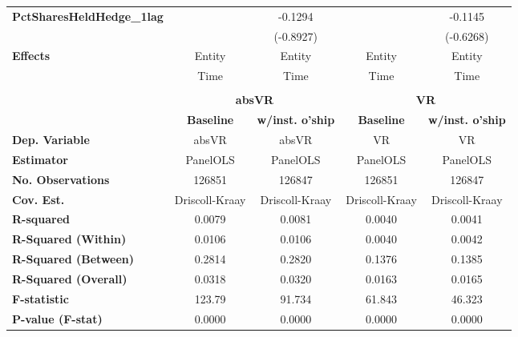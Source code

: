 {\begin{longtable}{>{\bfseries}lcccc}
\textbf{PctSharesHeldHedge\_1lag}          &                    &             -0.1294             &                    &          -0.1145            \\
\textbf{ }                                 &                    &            (-0.8927)            &                    &         (-0.6268)           \\
\midrule
\textbf{Effects}                           &       Entity       &              Entity             &       Entity       &           Entity            \\
& Time & Time & Time & Time\\
\bottomrule
\bigskip\\
\toprule
& \multicolumn{2}{c}{\textbf{absVR}} &  \multicolumn{2}{c}{\textbf{VR}}\\
\midrule
&   \textbf{Baseline}   & \textbf{w/inst. o'ship} &   \textbf{Baseline}  & \textbf{w/inst. o'ship} \\
\midrule
\textbf{Dep. Variable}                     &       absVR        &              absVR              &         VR         &             VR              \\
\textbf{Estimator}                         &      PanelOLS      &             PanelOLS            &      PanelOLS      &          PanelOLS           \\
\textbf{No. Observations}                  &       126851       &              126847             &       126851       &           126847            \\
\textbf{Cov. Est.}                         &   Driscoll-Kraay   &          Driscoll-Kraay         &   Driscoll-Kraay   &       Driscoll-Kraay        \\
\textbf{R-squared}                         &       0.0079       &              0.0081             &       0.0040       &           0.0041            \\
\textbf{R-Squared (Within)}                &       0.0106       &              0.0106             &       0.0040       &           0.0042            \\
\textbf{R-Squared (Between)}               &       0.2814       &              0.2820             &       0.1376       &           0.1385            \\
\textbf{R-Squared (Overall)}               &       0.0318       &              0.0320             &       0.0163       &           0.0165            \\
\textbf{F-statistic}                       &       123.79       &              91.734             &       61.843       &           46.323            \\
\textbf{P-value (F-stat)}                  &       0.0000       &              0.0000             &       0.0000       &           0.0000            \\
\bottomrule
\end{longtable}
}
